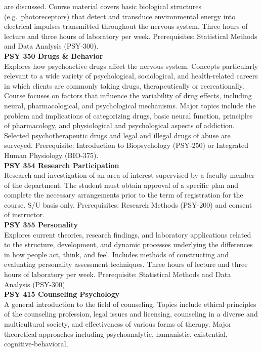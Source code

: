\documentclass[
  letterpaper,
]{scrbook}
\begin{document}
are discussed. Course material covers basic biological structures
(e.g.~photoreceptors) that detect and transduce environmental energy
into electrical impulses transmitted throughout the nervous system.
Three hours of lecture and three hours of laboratory per week.
Prerequisites: Statistical Methods and Data Analysis (PSY-300).\\
\textbf{PSY 350 Drugs \& Behavior}\\
Explores how psychoactive drugs affect the nervous system. Concepts
particularly relevant to a wide variety of psychological, sociological,
and health-related careers in which clients are commonly taking drugs,
therapeutically or recreationally. Course focuses on factors that
influence the variability of drug effects, including neural,
pharmacological, and psychological mechanisms. Major topics include the
problem and implications of categorizing drugs, basic neural function,
principles of pharmacology, and physiological and psychological aspects
of addiction. Selected psychotherapeutic drugs and legal and illegal
drugs of abuse are surveyed. Prerequisite: Introduction to Biopsychology
(PSY-250) or Integrated Human Physiology (BIO-375).\\
\textbf{PSY 354 Research Participation}\\
Research and investigation of an area of interest supervised by a
faculty member of the department. The student must obtain approval of a
specific plan and complete the necessary arrangements prior to the term
of registration for the course. S/U basis only. Prerequisites: Research
Methods (PSY-200) and consent of instructor.\\
\textbf{PSY 355 Personality}\\
Explores current theories, research findings, and laboratory
applications related to the structure, development, and dynamic
processes underlying the differences in how people act, think, and feel.
Includes methods of constructing and evaluating personality assessment
techniques. Three hours of lecture and three hours of laboratory per
week. Prerequisite: Statistical Methods and Data Analysis (PSY-300).\\
\textbf{PSY 415 Counseling Psychology}\\
A general introduction to the field of counseling. Topics include
ethical principles of the counseling profession, legal issues and
licensing, counseling in a diverse and multicultural society, and
effectiveness of various forms of therapy. Major theoretical approaches
including psychoanalytic, humanistic, existential, cognitive-behavioral,
\end{document}
